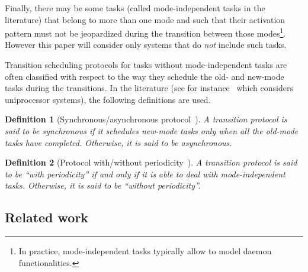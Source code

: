 \documentclass{article}
\newtheorem{Definition}{Definition}
\newtheorem{validity test}{Validity Test}
\begin{document}
Finally, there may be some tasks (called mode-independent tasks in the literature) that belong to more than one mode and such that their activation pattern must not be jeopardized during the transition between those modes\footnote{In practice, mode-independent tasks typically allow to model daemon functionalities.}. However this paper will  consider only systems that do \emph{not} include such tasks. 

Transition scheduling protocols for tasks without mode-independent tasks are often classified with respect to the way they schedule the old- and new-mode tasks during the transitions. In the literature (see for instance~\cite{JoAlfons:04} which considers uniprocessor systems), the following definitions are used. 

\begin{Definition}[Synchronous/asynchronous protocol~\cite{JoAlfons:04}] 
\label{def:Multimode:synchronous_asynchronous}
A transition protocol is said to be synchronous if it schedules new-mode tasks only when all the old-mode tasks have completed. Otherwise, it is said to be asynchronous. 
\end{Definition}

\begin{Definition}[Protocol with/without periodicity~\cite{JoAlfons:04}]
\label{def:Multimode:with_without_periodicity}
A transition protocol is said to be ``with periodicity'' if and only if it is able to deal with mode-independent tasks. Otherwise, it is said to be ``without periodicity''.
\end{Definition}

\subsection{Related work}
\end{document}
